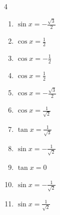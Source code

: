 \begin{multicols}{4}
\begin{enumerate}

  \item $\displaystyle \sin{x}  = -\frac{\sqrt{3}}{2}$


  \item $\displaystyle \cos{x}  = \frac{1}{2}$


  \item $\displaystyle \cos{x}  = -\frac{1}{2}$


  \item $\displaystyle \cos{x}  = \frac{1}{2}$


  \item $\displaystyle \cos{x}  = -\frac{\sqrt{3}}{2}$


  \item $\displaystyle \cos{x}  = \frac{1}{\sqrt{2}}$


\columnbreak %

\resetques

  \item $\displaystyle \tan{x}  = \frac{1}{\sqrt{3}}$


  \item $\displaystyle \sin{x}  = -\frac{1}{\sqrt{2}}$


  \item $\displaystyle \tan{x}  = 0$


  \item $\displaystyle \sin{x}  = -\frac{1}{\sqrt{2}}$


  \item $\displaystyle \sin{x}  = \frac{1}{\sqrt{2}}$


\end{enumerate}
\end{multicols}
